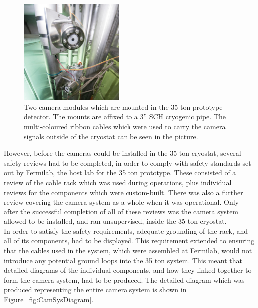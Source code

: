 \begin{figure}
  \centering
  \includegraphics[width=0.45\textwidth]{cammount35tcrop}
  \caption[Two camera modules which are mounted in the 35 ton prototype detector]
          {Two camera modules which are mounted in the 35 ton prototype detector. The mounts are affixed to a 3'' SCH cryogenic pipe. The multi-coloured ribbon cables which were used to carry the camera signals outside of the cryostat can be seen in the picture.}
  \label{fig:CamMount}
\end{figure}

However, before the cameras could be installed in the 35 ton cryostat, several safety reviews had to be completed, in order to comply with safety standards set out by Fermilab, the host lab for the 35 ton prototype. These consisted of a review of the cable rack which was used during operations, plus individual reviews for the components which were custom-built. There was also a further review covering the camera system as a whole when it was operational. Only after the successful completion of all of these reviews was the camera system allowed to be installed, and ran unsupervised, inside the 35 ton cryostat. \\

In order to satisfy the safety requirements, adequate grounding of the rack, and all of its components, had to be displayed. This requirement extended to ensuring that the cables used in the system, which were assembled at Fermilab, would not introduce any potential ground loops into the 35 ton system. This meant that detailed diagrams of the individual components, and how they linked together to form the camera system, had to be produced. The detailed diagram which was produced representing the entire camera system is shown in Figure~\ref{fig:CamSysDiagram}. \\

